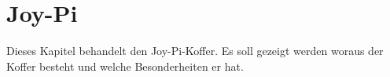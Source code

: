 \begin{figure}[H] %
\end{figure} %


\chapter{Joy-Pi}
Dieses Kapitel behandelt den Joy-Pi-Koffer. Es soll gezeigt werden woraus der Koffer besteht und welche Besonderheiten er hat.

